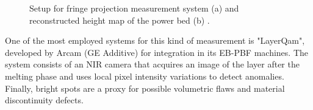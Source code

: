 \begin{figure}
    \centering
    \qquad
    \caption[Fringe projection.]{Setup for fringe projection measurement system (a) and reconstructed height map of the power bed (b) \cite{zhang_situ_2016}.}
\end{figure}
One of the most employed systems for this kind of measurement is "LayerQam", developed by Arcam (GE Additive) for integration in its EB-PBF machines. The system consists of an NIR camera that acquires an image of the layer after the melting phase and uses local pixel intensity variations to detect anomalies. Finally, bright spots are a proxy for possible volumetric flaws and material discontinuity defects.
